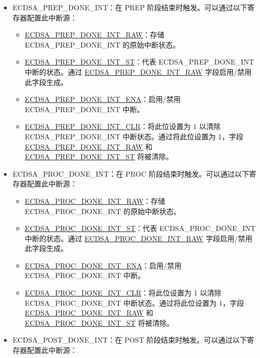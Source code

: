 \documentclass[main\_\_CN.tex]{subfiles}
\begin{document}
\begin{itemize}
	\item \label{int:ECDSAPREPDONEINT}ECDSA\_PREP\_DONE\_INT：在 PREP 阶段结束时触发。可以通过以下寄存器配置此中断源：
	      \begin{itemize}
		      \item \hyperref[fielddesc:ECDSAPREPDONEINTRAW]{ECDSA\_PREP\_DONE\_INT\_RAW}：存储 ECDSA\_PREP\_DONE\_INT 的原始中断状态。
		      \item \hyperref[fielddesc:ECDSAPREPDONEINTST]{ECDSA\_PREP\_DONE\_INT\_ST}：代表 ECDSA\_PREP\_DONE\_INT 中断的状态。通过 \hyperref[fielddesc:ECDSAPREPDONEINTRAW]{ECDSA\_PREP\_DONE\_INT\_RAW} 字段启用/禁用此字段生成。
		      \item \hyperref[fielddesc:ECDSAPREPDONEINTENA]{ECDSA\_PREP\_DONE\_INT\_ENA}：启用/禁用 ECDSA\_PREP\_DONE\_INT 中断。
		      \item \hyperref[fielddesc:ECDSAPREPDONEINTCLR]{ECDSA\_PREP\_DONE\_INT\_CLR}：将此位设置为 1 以清除 ECDSA\_PREP\_DONE\_INT 中断状态。通过将此位设置为 1，字段 \hyperref[fielddesc:ECDSAPREPDONEINTRAW]{ECDSA\_PREP\_DONE\_INT\_RAW} 和 \hyperref[fielddesc:ECDSAPREPDONEINTST]{ECDSA\_PREP\_DONE\_INT\_ST} 将被清除。
	      \end{itemize}
          \item \label{int:ECDSAPROCDONEINT}ECDSA\_PROC\_DONE\_INT：在 PROC 阶段结束时触发。可以通过以下寄存器配置此中断源：
	      \begin{itemize}
		      \item \hyperref[fielddesc:ECDSAPROCDONEINTRAW]{ECDSA\_PROC\_DONE\_INT\_RAW}：存储 ECDSA\_PROC\_DONE\_INT 的原始中断状态。
		      \item \hyperref[fielddesc:ECDSAPROCDONEINTST]{ECDSA\_PROC\_DONE\_INT\_ST}：代表 ECDSA\_PROC\_DONE\_INT 中断的状态。通过 \hyperref[fielddesc:ECDSAPROCDONEINTRAW]{ECDSA\_PROC\_DONE\_INT\_RAW} 字段启用/禁用此字段生成。
		      \item \hyperref[fielddesc:ECDSAPROCDONEINTENA]{ECDSA\_PROC\_DONE\_INT\_ENA}：启用/禁用 ECDSA\_PROC\_DONE\_INT 中断。
		      \item \hyperref[fielddesc:ECDSAPROCDONEINTCLR]{ECDSA\_PROC\_DONE\_INT\_CLR}：将此位设置为 1 以清除 ECDSA\_PROC\_DONE\_INT 中断状态。通过将此位设置为 1，字段 \hyperref[fielddesc:ECDSAPROCDONEINTRAW]{ECDSA\_PROC\_DONE\_INT\_RAW} 和 \hyperref[fielddesc:ECDSAPROCDONEINTST]{ECDSA\_PROC\_DONE\_INT\_ST} 将被清除。
	      \end{itemize}
          \item \label{int:ECDSAPOSTDONEINT}ECDSA\_POST\_DONE\_INT：在 POST 阶段结束时触发。可以通过以下寄存器配置此中断源：

\end{itemize}
\end{document}
